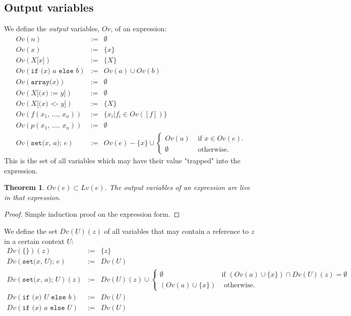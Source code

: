 \documentclass[12pt,a4paper]{article}
\newcommand{\cl}[1]{\texttt{#1}}
\newtheorem{theorem}{Theorem}
\newcommand{\ucont}[1]{\{#1\}}
\begin{document}
\subsection{Output variables}

We define the \emph{output} variables, $Ov$, of an expression:
\begin{eqnarray*}
Ov( n ) & := & \emptyset \\
Ov( x ) & := & \{ x \} \\
Ov( X\cl{[}x\cl{]} ) & := & \{ X \} \\
Ov( \cl{if (} x \cl{) } a \cl{ else } b ) & := & Ov(a) \cup Ov(b) \\
Ov( \cl{array(} x \cl{)} ) & := & \emptyset \\
Ov( X \cl{[(} x \cl{) := } y \cl{]} ) & := & \emptyset \\
Ov( X \cl{[(} x \cl{) <- } y \cl{]} ) & := & \{ X \} \\
Ov( f(x_1 \cl{, } ... \cl{, } x_n) ) & := & \{ x_i | f_i \in Ov([f]) \} \\
Ov( p(x_1 \cl{, } ... \cl{, } x_n) ) & := & \emptyset \\
Ov( \cl{set(} x \cl{, } a \cl{); } e ) &:=& Ov(e) - \{x\} \cup \left\lbrace \begin{array}{ll}
Ov(a) & \text{ if $x \in Ov(e)$.} \\
\emptyset & \text{ otherwise.}
\end{array} \right.
\end{eqnarray*}
This is the set of all variables which may have their value "trapped" into the expression.

\begin{theorem}
$Ov(e) \subset Lv(e)$. The output variables of an expression are live in that expression.
\end{theorem}
\begin{proof}
Simple induction proof on the expression form.
\end{proof}


We define the set $Dv(U)(z)$ of all variables that may contain a reference to $z$ in a certain context $U$:
\begin{eqnarray*}
Dv(\ucont{})(z) &:=& \{ z \} \\
Dv( \cl{set(} x \cl{, } U \cl{); } e ) &:=& Dv(U) \\
Dv( \cl{set(} x \cl{, } a \cl{); } U )(z) &:=& Dv(U)(z) \cup
  \left\lbrace \begin{array}{ll}
  \emptyset & \text{if } (Ov(a) \cup \{ x \}) \cap Dv(U)(z) = \emptyset \\
  (Ov(a) \cup \{ x \}) & \text{ otherwise.}
  \end{array} \right. \\
Dv(\cl{if (} x \cl{) } U \cl{ else } b) &:=& Dv(U) \\
Dv(\cl{if (} x \cl{) } a \cl{ else } U) &:=& Dv(U) 
\end{eqnarray*}
\end{document}
